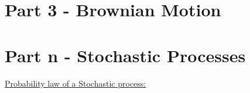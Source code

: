 \documentclass[12pt]{article}
\newcommand{\A}[0] { \mathcal{A} }
\newcommand{\F}[0] { \mathcal{F} }
\begin{document}
\section*{Part 3 - Brownian Motion }




\section*{Part n - Stochastic Processes }

\begin{flushleft}
\underline{Probability law of a Stochastic process:}
\end{flushleft}

\end{document}
